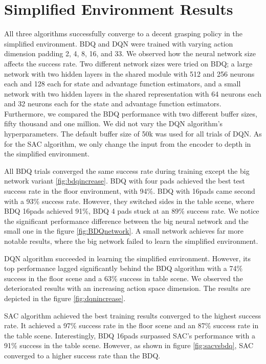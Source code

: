 \section{Simplified Environment Results}

All three algorithms successfully converge to a decent grasping policy in the simplified environment. BDQ and DQN  were trained with varying action dimension padding 2, 4, 8, 16, and 33.
We observed how the neural network size affects the success rate. Two different network sizes were tried on BDQ; a large network with two hidden layers in the shared module with 512 and 256 neurons each and 128 each for state and advantage function estimators, and a small network with two hidden layers in the shared representation with 64 neurons each and 32 neurons each for the state and advantage function estimators. Furthermore, we compared the BDQ performance with two different buffer sizes, fifty thousand and one million. We did not vary the DQN algorithm's hyperparameters. The default buffer size of 50k was used for all trials of DQN.
As for the SAC algorithm, we only change the input from the encoder to depth in the simplified environment.

All BDQ trials converged the same success rate during training except the big network variant \ref{fig:bdqincrease}. BDQ with four pads achieved the best test success rate in the floor environment, with 94\%. BDQ with 16pads came second with a 93\% success rate. However, they switched sides in the table scene, where BDQ 16pads achieved 91\%, BDQ 4 pads stuck at an 89\% success rate. We notice the significant performance difference between the big neural network and the small one in the figure \ref{fig:BDQnetwork}. A small network achieves far more notable results, where the big network failed to learn the simplified environment.

DQN algorithm succeeded in learning the simplified environment. However, its top performance lagged significantly behind the BDQ algorithm with a 74\% success in the floor scene and a 63\% success in table scene. We observed the deteriorated results with an increasing action space dimension. The results are depicted in the figure \ref{fig:dqnincrease}.

SAC algorithm achieved the best training results converged to the highest success rate. It achieved a 97\% success rate in the floor scene and an 87\% success rate in the table scene. Interestingly, BDQ 16pads surpassed SAC's performance with a 91\% success in the table scene. However, as shown in figure \ref{fig:sacvsbdq}, SAC converged to a higher success rate than the BDQ.

